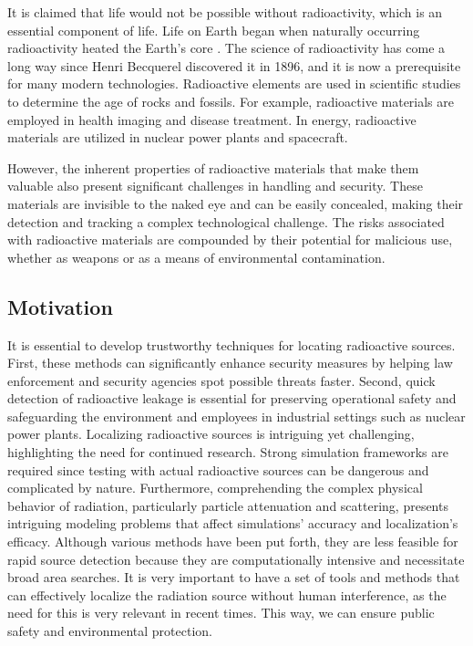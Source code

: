\documentclass[../report.tex]{subfiles}
\begin{document}
    It is claimed that life would not be possible without radioactivity, which is an essential component of life. Life on Earth began when naturally occurring radioactivity heated
    the Earth's core \cite{DOEExplainsRadioactivity}. The science of radioactivity has come a long way since Henri Becquerel discovered it in 1896, and it is now a prerequisite for
    many modern technologies. Radioactive elements are used in scientific studies to determine the age of rocks and fossils. For example, radioactive materials are
    employed in health imaging and disease treatment. In energy, radioactive materials are utilized in nuclear power plants and spacecraft.


    However, the inherent properties of radioactive materials that make them valuable also present significant challenges in handling and security. These materials are
    invisible to the naked eye and can be easily concealed, making their detection and tracking a complex technological challenge. The risks associated with radioactive materials
    are compounded by their potential for malicious use, whether as weapons or as a means of environmental contamination.
    \subsection{Motivation}
    \label{sec:introduction:motivation}

    It is essential to develop trustworthy techniques for locating radioactive sources. First, these methods can significantly enhance security measures by helping law enforcement and security 
    agencies spot possible threats faster. Second, quick detection of radioactive leakage is essential for preserving operational safety and safeguarding the environment and employees in industrial 
    settings such as nuclear power plants. Localizing radioactive sources is intriguing yet challenging, highlighting the need for continued research. Strong simulation frameworks are required 
    since testing with actual radioactive sources can be dangerous and complicated by nature. Furthermore, comprehending the complex physical behavior of radiation, particularly particle 
    attenuation and scattering, presents intriguing modeling problems that affect simulations' accuracy and localization's efficacy. Although various methods have been put forth, they are less 
    feasible for rapid source detection because they are computationally intensive and necessitate broad area searches.  It is very important to have a set of tools and methods that can effectively
    localize the radiation source without human interference, as the need for this is very relevant in recent times. This way, we can ensure public safety and environmental protection. 
\end{document}
